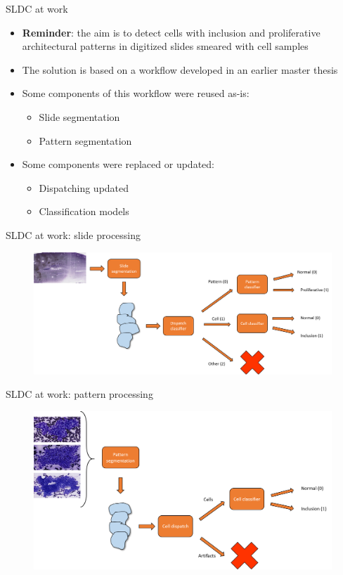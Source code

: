 \documentclass{beamer}
\begin{document}
\begin{frame}{SLDC at work}
	\begin{itemize}
		\item \textbf{Reminder}: the aim is to detect cells with inclusion and proliferative architectural patterns in digitized slides smeared with cell samples
		\item The solution is based on a workflow developed in an earlier master thesis
		\item Some components of this workflow were reused as-is: 
		\begin{itemize}
			\item Slide segmentation
			\item Pattern segmentation
		\end{itemize}
		\item Some components were replaced or updated: 
		\begin{itemize}
			\item Dispatching updated
			\item Classification models
		\end{itemize}
	\end{itemize}
\end{frame}


\begin{frame}{SLDC at work: slide processing}
	\begin{figure}
		\includegraphics[scale=0.35]{images/thyroid_workflow_1.png}
	\end{figure}
\end{frame}


\begin{frame}{SLDC at work: pattern processing}
	\begin{figure}
		\includegraphics[scale=0.4]{images/thyroid_workflow_2.png}
	\end{figure}
\end{frame}
\end{document}
